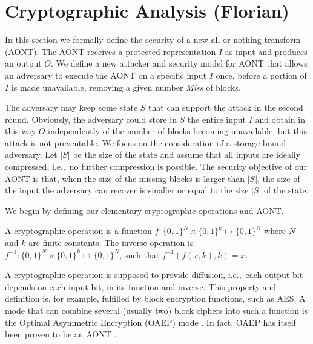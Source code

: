 
\section{Cryptographic Analysis (Florian)}

In this section we formally define the security of a new all-or-nothing-transform (AONT).
The AONT receives a protected representation $I$ as input and produces an output $O$. %
We define a new attacker and security model for AONT that allows an adversary to execute the AONT
on a specific input $I$ once, before a portion of $I$ is made unavailable, removing a given number {\em Miss} of blocks.

The adversary may keep some state $S$ that can support the attack in the second round.
Obviously, the adversary could store in $S$ the entire input $I$ and obtain in this way $O$ independently of the number of blocks becoming unavailable, but this attack is not preventable. We focus on the consideration of a storage-bound adversary.
Let $|S|$ be the size of the state and assume that all inputs are ideally compressed, i.e.,~no further compression is possible.
The security objective of our AONT is that, when the size of the missing blocks is larger than $|S|$, the size of the input the adversary can recover is smaller or equal to the size $|S|$ of the state.

We begin by defining our elementary cryptographic operations and AONT.
\begin{defn}
A cryptographic operation is a function $f : \{0,1\}^{N} \times \{0,1\}^k \mapsto \{0,1\}^{N}$ where $N$ and $k$ are finite constants.
The inverse operation is $f^{-1}: \{0,1\}^{N} \times \{0,1\}^k \mapsto \{0,1\}^{N}$, such that $f^{-1}(f(x, k), k) = x$.
\end{defn}

A cryptographic operation is supposed to provide diffusion, i.e.,~each output bit depends on each input bit, in its function and inverse.
This property and definition is, for example, fulfilled by block encryption functions, such as AES.
A mode that can combine several (usually two) block ciphers into such a function is the Optimal Asymmetric Encryption (OAEP) mode \cite{BelRog94}.
In fact, OAEP has itself been proven to be an AONT \cite{Boy99}.

